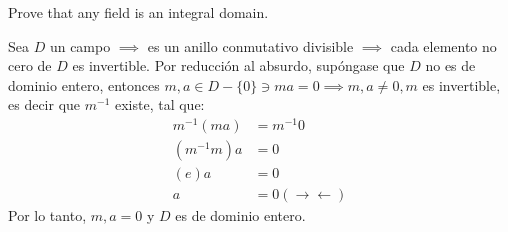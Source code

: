 \begin{problema}[Problema 12]
    Prove that any field is an integral domain.
    \begin{dem}
        Sea $D$ un campo $\implies$ es un anillo conmutativo divisible $\implies$ cada elemento no cero de $D$ es invertible. Por reducción al absurdo, supóngase que $D$ no es de dominio entero, entonces $m,a\in D-\{0\}\ni ma=0\implies m,a\neq 0, m$ es invertible, es decir que $m^{-1}$ existe, tal que: 
        \begin{align*}
            m^{-1}(ma) &= m^{-1}0\\
            (m^{-1}m)a &= 0\\
            (e)a &= 0\\
            a &= 0 (\to\gets)
        \end{align*}
        Por lo tanto, $m,a=0$ y $D$ es de dominio entero. 
    \end{dem}
\end{problema}





%

